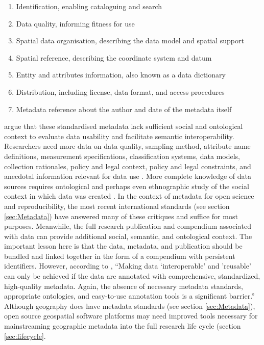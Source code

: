 \documentclass{isprs} %
\begin{document}
\begin{enumerate}
\setlength\itemsep{0em}\setlength\parskip{0em}\setlength\topsep{0em}\setlength\partopsep{0em}\setlength\parsep{0em} 
\item{Identification, enabling cataloguing and search} 
\item{Data quality, informing fitness for use}
\item{Spatial data organisation, describing the data model and spatial support}
\item{Spatial reference, describing the coordinate system and datum}
\item{Entity and attributes information, also known as a data dictionary}
\item{Distribution, including license, data format, and access procedures}
\item{Metadata reference about the author and date of the metadata itself}
\end{enumerate}

\citet{Schuurman2006,Comber2008} argue that these standardised metadata lack sufficient social and ontological context to evaluate data usability and facilitate semantic interoperability.
Researchers need more data on data quality, sampling method, attribute name definitions, measurement specifications, classification systems, data models, collection rationales, policy and legal context, policy and legal constraints, and anecdotal information relevant for data use \citep{Schuurman2006}.
More complete knowledge of data sources requires ontological and perhaps even ethnographic study of the social context in which data was created \citep{Schuurman2008}.
In the context of metadata for open science and reproducibility, the most recent international standards (see section \ref{sec:Metadata}) have answered many of these critiques and suffice for most purposes.
Meanwhile, the full research publication and compendium associated with data can provide additional social, semantic, and ontological context.
The important lesson here is that the data, metadata, and publication should be bundled and linked together in the form of a compendium with persistent identifiers.
However, according to \citet[137-8]{NASEM2018}, ``Making data `interoperable' and 'reusable' can only be achieved if the data are annotated with comprehensive, standardized, high-quality metadata. Again, the absence of necessary metadata standards, appropriate ontologies, and easy-to-use annotation tools is a significant barrier.''
Although geography does have metadata standards (see section \ref{sec:Metadata}), open source geospatial software platforms may need improved tools necessary for mainstreaming geographic metadata into the full research life cycle (section \ref{sec:lifecycle}.
\end{document}
